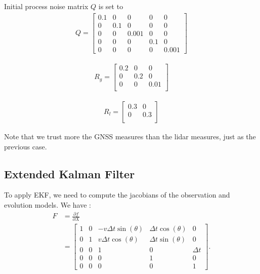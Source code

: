 \documentclass[conference]{IEEEtran}
\begin{document}
\noindent Initial process noise matrix $Q$ is set to
\begin{align*}
   Q = \begin{bmatrix}
    0.1 & 0 & 0 & 0 & 0 \\ 
    0 & 0.1 & 0 & 0 & 0 \\
    0 & 0 & 0.001 & 0 & 0 \\
    0 & 0 & 0 & 0.1 & 0 \\
    0 & 0 & 0 & 0 & 0.001
    \end{bmatrix}
\end{align*}

\begin{align*}
   R_g = \begin{bmatrix}
    0.2 & 0 & 0 \\ 
    0 & 0.2 & 0 \\
    0 & 0 & 0.01  \\
    \end{bmatrix}
\end{align*}


\begin{align*}
   R_l = \begin{bmatrix}
    0.3 & 0 \\ 
    0 & 0.3 \\
    \end{bmatrix}
\end{align*}

\noindent Note that we trust more the GNSS measures than the lidar measures, just as the previous case.

\subsection{Extended Kalman Filter}

To apply EKF, we need to compute the jacobians of the observation and evolution models. We have :
\begin{align*}
    F &= \frac{\partial f}{\partial X} \\ 
    &=
    \begin{bmatrix}
    1 & 0 & -v \Delta t \sin(\theta) & \Delta t \cos(\theta) & 0 \\
    0 & 1 & v \Delta t \cos(\theta) & \Delta t \sin(\theta) & 0 \\
    0 & 0 & 1 & 0 & \Delta t \\
    0 & 0 & 0 & 1 & 0 \\
    0 & 0 & 0 & 0 & 1
    \end{bmatrix}.
\end{align*}
\end{document}
